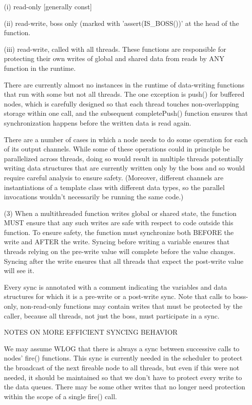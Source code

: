   (i) read-only [generally const]

  (ii) read-write, boss only (marked with 'assert(IS_BOSS())' at the
      head of the function.

  (iii) read-write, called with all threads.  These functions are
      responsible for protecting their own writes of global and shared
      data from reads by ANY function in the runtime.

There are currently almost no instances in the runtime of data-writing
functions that run with some but not all threads.  The one exception
is push() for buffered nodes, which is carefully designed so that each
thread touches non-overlapping storage within one call, and the
subsequent completePush() function ensures that synchronization
happens before the written data is read again.

There are a number of cases in which a node needs to do some operation
for each of its output channels.  While some of these operations could
in principle be parallelized across threads, doing so would result in
multiple threads potentially writing data structures that are
currently written only by the boss and so would require careful
analysis to ensure safety.  (Moreover, different channels are
instantiations of a template class with different data types, so the
parallel invocations wouldn't necessarily be running the same code.)

(3) When a multithreaded function writes global or shared state, the
function MUST ensure that any such writes are safe with respect to
code outside this function.  To ensure safety, the function must
synchronize both BEFORE the write and AFTER the write.  Syncing before
writing a variable ensures that threads relying on the pre-write value
will complete before the value changes.  Syncing after the write
ensures that all threads that expect the post-write value will see it.

Every sync is annotated with a comment indicating the variables and
data structures for which it is a pre-write or a post-write sync. Note
that calls to boss-only, non-read-only functions may contain writes
that must be protected by the caller, because all threads, not just
the boss, must participate in a sync.

NOTES ON MORE EFFICIENT SYNCING BEHAVIOR

We may assume WLOG that there is always a sync between successive
calls to nodes' fire() functions.  This sync is currently needed in
the scheduler to protect the broadcast of the next fireable node to
all threads, but even if this were not needed, it should be maintained
so that we don't have to protect every write to the data queues.  There
may be some other writes that no longer need protection within the scope
of a single fire() call.

